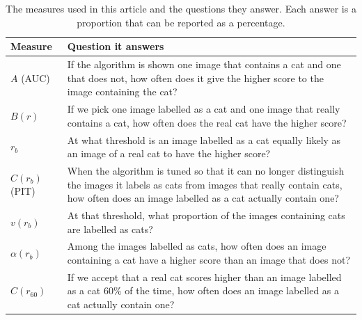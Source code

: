 \documentclass[preprint,12pt]{article}
\begin{document}
\begin{table}[tp]
\centering
\small
\begin{tabular}{p{2.3cm}p{9.4cm}}
\toprule
Measure & Question it answers \\
\midrule
$A$ (AUC) & If the algorithm is shown one image that contains a cat and one that does not, how often does it give the higher score to the image containing the cat? \\[3pt]
$B(r)$ & If we pick one image labelled as a cat and one image that really contains a cat, how often does the real cat have the higher score? \\[3pt]
$r_b$ & At what threshold is an image labelled as a cat equally likely as an image of a real cat to have the higher score? \\[3pt]
$C(r_b)$ (PIT) & When the algorithm is tuned so that it can no longer distinguish the images it labels as cats from images that really contain cats, how often does an image labelled as a cat actually contain one? \\[3pt]
$v(r_b)$ & At that threshold, what proportion of the images containing cats are labelled as cats? \\[3pt]
$\alpha(r_b)$ & Among the images labelled as cats, how often does an image containing a cat have a higher score than an image that does not? \\[3pt]
$C(r_{60})$ & If we accept that a real cat scores higher than an image labelled as a cat 60\% of the time, how often does an image labelled as a cat actually contain one? \\
\bottomrule
\end{tabular}
\caption{The measures used in this article and the questions they answer. Each answer is a proportion that can be reported as a percentage.}
\label{tab:words}
\end{table}
\end{document}
